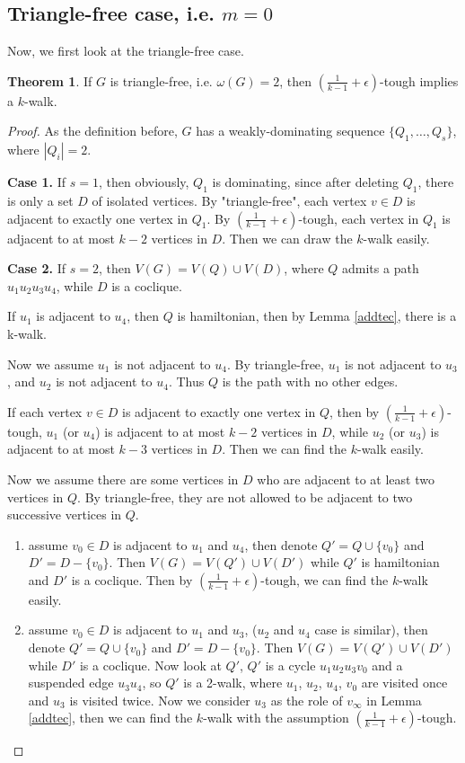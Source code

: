 \documentclass{amsart}
\theoremstyle{definition}
\newtheorem{theorem}{Theorem}
\begin{document}
\subsection{Triangle-free case, i.e. $m=0$}
Now, we first look at the triangle-free case.

\begin{theorem}\label{trifree}
If $G$ is triangle-free, i.e. $\omega(G)=2$, then $(\frac{1}{k-1}+\epsilon)$-tough implies a $k$-walk.
\end{theorem}




\begin{proof}
As the definition before, $G$ has a weakly-dominating sequence $\{Q_1,\ldots,Q_s\}$, where $|Q_i|=2$.

{\bf Case 1.} If $s=1$, then obviously, $Q_1$ is dominating, since after deleting $Q_1$, there is only a set $D$ of isolated vertices.
By "triangle-free", each vertex $v\in D$ is adjacent to exactly one vertex in $Q_1$. By $(\frac{1}{k-1}+\epsilon)$-tough, each vertex in $Q_1$ is adjacent to at most $k-2$ vertices in $D$. Then we can draw the $k$-walk easily.

{\bf Case 2.} If $s=2$, then $V(G)=V(Q)\cup V(D)$, where $Q$ admits a path $u_1u_2u_3u_4$, while $D$ is a coclique.


If $u_1$ is adjacent to $u_4$, then $Q$ is hamiltonian, then by Lemma \ref{addtec}, there is a k-walk.

Now we assume $u_1$ is not adjacent to $u_4$.
By triangle-free, $u_1$ is not adjacent to $u_3$, and $u_2$ is not adjacent to $u_4$. Thus $Q$ is the path with no other edges.

If each vertex $v\in D$ is adjacent to exactly one vertex in $Q$, then by $(\frac{1}{k-1}+\epsilon)$-tough, $u_1$ (or $u_4$) is adjacent to at most $k-2$ vertices in $D$, while $u_2$ (or $u_3$) is adjacent to at most $k-3$ vertices in $D$. Then we can find the $k$-walk easily.

Now we assume there are some vertices in $D$ who are adjacent to at least two vertices in $Q$.
By triangle-free, they are not allowed to be adjacent to two successive vertices in $Q$.

\begin{enumerate}
\item assume $v_0\in D$ is adjacent to $u_1$ and $u_4$, then denote $Q'=Q\cup\{v_0\}$ and $D'=D-\{v_0\}$. Then $V(G)=V(Q')\cup V(D')$ while $Q'$ is hamiltonian and $D'$ is a coclique. Then by $(\frac{1}{k-1}+\epsilon)$-tough, we can find the $k$-walk easily.
\item assume $v_0\in D$ is adjacent to $u_1$ and $u_3$, ($u_2$ and $u_4$ case is similar), then denote $Q'=Q\cup\{v_0\}$ and $D'=D-\{v_0\}$. Then $V(G)=V(Q')\cup V(D')$ while $D'$ is a coclique. Now look at $Q'$, $Q'$ is a cycle $u_1u_2u_3v_0$ and a suspended edge $u_3u_4$, so $Q'$ is a 2-walk, where $u_1$, $u_2$, $u_4$, $v_0$ are visited once and $u_3$ is visited twice. Now we consider $u_3$ as the role of $v_{\infty}$ in Lemma \ref{addtec}, then we can find the $k$-walk with the assumption $(\frac{1}{k-1}+\epsilon)$-tough.
\end{enumerate}


\end{proof}
\end{document}
